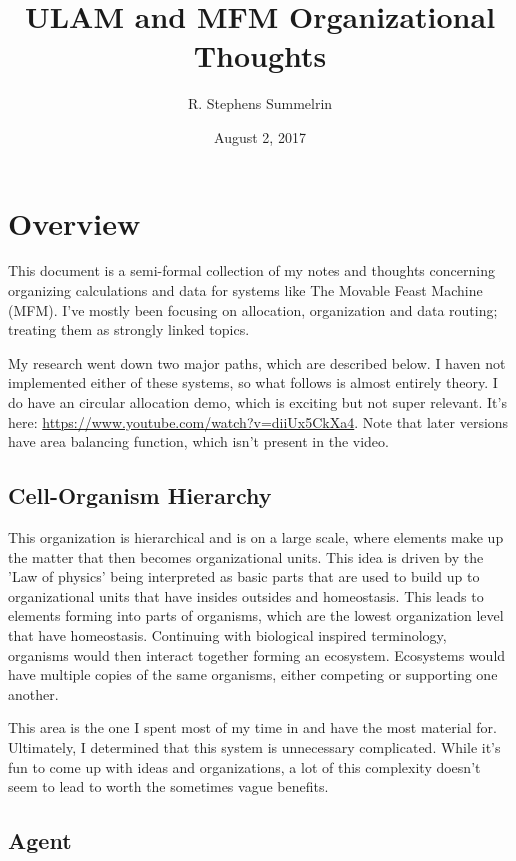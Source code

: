 \documentclass[article,12pt,oneside]{memoir}
\title{ULAM and MFM Organizational Thoughts}
\date{August 2, 2017}
\author{R. Stephens Summelrin}
\begin{document}
\maketitle
\tableofcontents

\pagebreak
\chapter{Overview}

This document is a semi-formal collection of my notes and thoughts concerning organizing calculations and data for systems like The Movable Feast Machine (MFM).
I've mostly been focusing on allocation, organization and data routing; treating them as strongly linked topics.

My research went down two major paths, which are described below.
I haven not implemented either of these systems, so what follows is almost entirely theory.
I do have an circular allocation demo, which is exciting but not super relevant.
It's here: \url{https://www.youtube.com/watch?v=diiUx5CkXa4}.
Note that later versions have area balancing function, which isn't present in the video.


\section{Cell-Organism Hierarchy}

This organization is hierarchical and is on a large scale, where elements make up the matter that then becomes organizational units.
This idea is driven by the 'Law of physics' being interpreted as basic parts that are used to build up to organizational units that have insides outsides and homeostasis.
This leads to elements forming into parts of organisms, which are the lowest organization level that have homeostasis.
Continuing with biological inspired terminology, organisms would then interact together forming an ecosystem.
Ecosystems would have multiple copies of the same organisms, either competing or supporting one another.

This area is the one I spent most of my time in and have the most material for.
Ultimately, I determined that this system is unnecessary complicated.
While it's fun to come up with ideas and organizations, a lot of this complexity doesn't seem to lead to worth the sometimes vague benefits.


\section{Agent}
\end{document}
